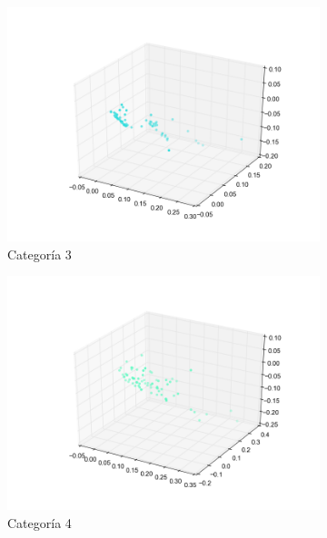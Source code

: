 \begin{figure}[H]
\begin{subfigure}[b]{0.33\textwidth}
                \includegraphics[width=\linewidth]{secciones/graficos/oja/categoria_3.png}
                \caption{Categoría 3}
                \label{fig: ej1_oja_categoria_3}
        \end{subfigure}
        \begin{subfigure}[b]{0.33\textwidth}
                \includegraphics[width=\linewidth]{secciones/graficos/oja/categoria_4.png}
                \caption{Categoría 4}
                \label{fig: ej1_oja_categoria_4}
        \end{subfigure}
        \begin{subfigure}[b]{0.33\textwidth}

\end{subfigure}
\end{figure}
